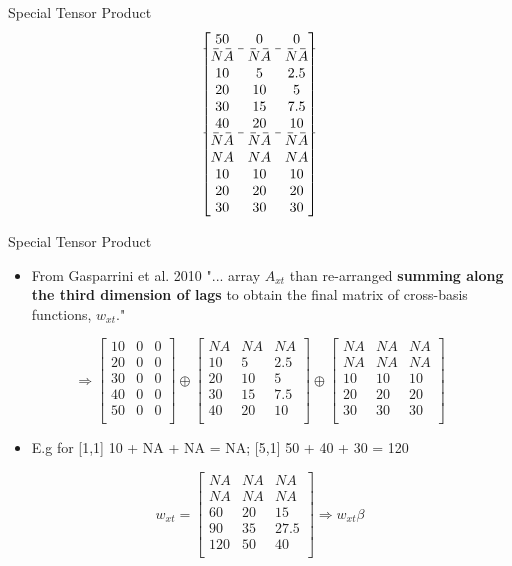 \documentclass[english]{beamer}
\newcommand{\alertblue}[1]{{\color{blue}#1}}
\begin{document}
\begin{frame}{Special Tensor Product}
\[\begin{bmatrix}
50 & 0 & 0 \\ \hdashline
NA & NA & NA \\
10 & 5 & 2.5 \\
20 & 10 & 5 \\
30 & 15 & 7.5 \\
40 & 20 & 10 \\ \hdashline
NA & NA & NA \\
NA & NA & NA \\
10 & 10 & 10 \\
20 & 20 & 20 \\
30 & 30 & 30 \\
\end{bmatrix}
\]
\end{frame}

\begin{frame}{Special Tensor Product}
\begin{itemize}
    \item From Gasparrini et al. 2010 "... array \(A_{xt}\) than re-arranged \textbf{\alertblue{summing along the third dimension of lags}} to obtain the final matrix of cross-basis functions, \(w_{xt}\)."
\end{itemize}
\vspace{0.3cm}
\[
\Rightarrow 
\begin{bmatrix}
10 & 0 & 0 \\
20 & 0 & 0 \\
30 & 0 & 0 \\
40 & 0 & 0 \\
50 & 0 & 0 \\ 
\end{bmatrix} \oplus
\begin{bmatrix}
NA & NA & NA \\
10 & 5 & 2.5 \\
20 & 10 & 5 \\
30 & 15 & 7.5 \\
40 & 20 & 10 \\ 
\end{bmatrix} \oplus
\begin{bmatrix}
NA & NA & NA \\
NA & NA & NA \\
10 & 10 & 10 \\
20 & 20 & 20 \\
30 & 30 & 30 \\
\end{bmatrix}
\]
\begin{itemize} 
    \item E.g for [1,1] 10 + NA + NA = NA; [5,1] 50 + 40 + 30 = 120
\end{itemize}
\[ w_{xt} =
\begin{bmatrix}
NA & NA & NA \\
NA & NA & NA \\
60 & 20 & 15 \\
90 & 35 & 27.5 \\
120 & 50 & 40 \\
\end{bmatrix} \Rightarrow w_{xt}\beta
\]
\end{frame}
\end{document}
